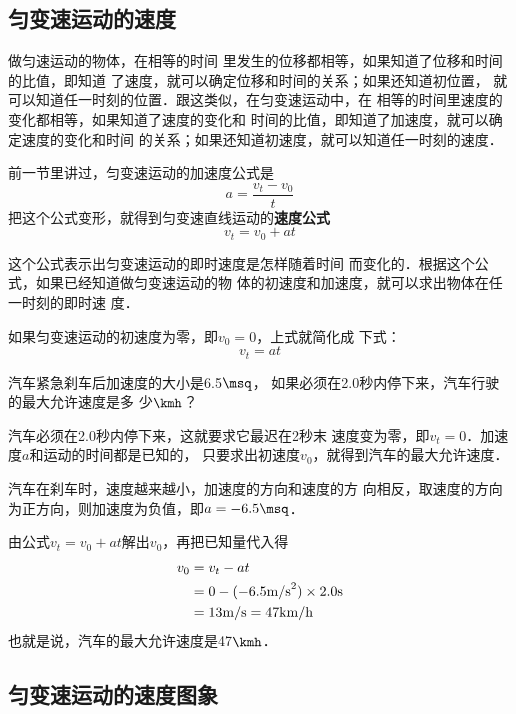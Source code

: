     \subsection{匀变速运动的速度}

做匀速运动的物体，在相等的时间
里发生的位移都相等，如果知道了位移和时间的比值，即知道
了速度，就可以确定位移和时间的关系；如果还知道初位置，
就可以知道任一时刻的位置．跟这类似，在匀变速运动中，在
相等的时间里速度的变化都相等，如果知道了速度的变化和
时间的比值，即知道了加速度，就可以确定速度的变化和时间
的关系；如果还知道初速度，就可以知道任一时刻的速度．

    前一节里讲过，匀变速运动的加速度公式是
\[a=\frac{v_t-v_0}{t} \]
把这个公式变形，就得到匀变速直线运动的\textbf{速度公式}
\[v_t=v_0+at \]

    这个公式表示出匀变速运动的即时速度是怎样随着时间
而变化的．根据这个公式，如果已经知道做匀变速运动的物
体的初速度和加速度，就可以求出物体在任一时刻的即时速
度．

    如果匀变速运动的初速度为零，即$v_0=0$，上式就简化成
下式：
\[v_t=at \]


\begin{example}
汽车紧急刹车后加速度的大小是6.5$\msq$，
如果必须在2.0秒内停下来，汽车行驶的最大允许速度是多
少$\kmh$？
\end{example}

\begin{solution}
    汽车必须在2.0秒内停下来，这就要求它最迟在2秒末
速度变为零，即$v_t=0$．加速度$a$和运动的时间都是已知的，
只要求出初速度$v_0$，就得到汽车的最大允许速度．

    汽车在刹车时，速度越来越小，加速度的方向和速度的方
向相反，取速度的方向为正方向，则加速度为负值，即$a=-
6.5\msq$．

    由公式$v_t=v_0+at$解出$v_0$，再把已知量代入得
\[\begin{split}
v_0&=v_t-at\\
&=0-(-6.5{\rm m/s}^2)\times 2.0{\rm s}\\
&=13{\rm m/s}=47{\rm km/h}
\end{split} \]
也就是说，汽车的最大允许速度是47$\kmh$．
\end{solution}

   \subsection{匀变速运动的速度图象}


